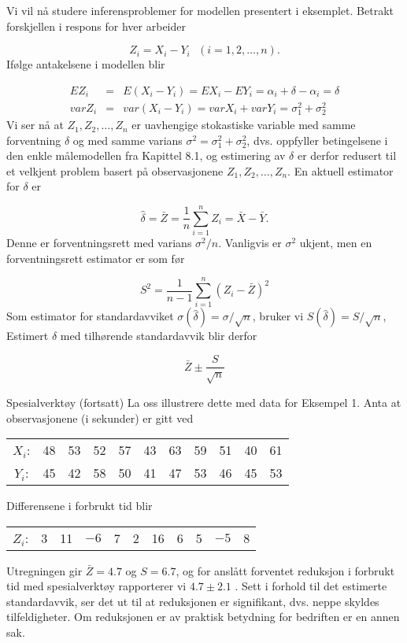Vi vil nå studere inferensproblemer for modellen presentert i 
eksemplet.  Betrakt forskjellen i respons for hver arbeider

\[  Z_i = X_i - Y_i  \mbox{\ \ \ }   (i = 1, 2, \ldots, n).      \]
Ifølge antakelsene i modellen blir

\begin{eqnarray*}
EZ_i&=& E(X_i-Y_i)=EX_i-EY_i={\alpha}_i + \delta - {\alpha}_i = \delta \\
varZ_i&=& var(X_i-Y_i)=varX_i+varY_i={\sigma}_1^2 + {\sigma}_2^2 
\end{eqnarray*}
Vi ser nå at $Z_1, Z_2, \ldots, Z_n$ er uavhengige stokastiske
variable med samme forventning $\delta$ og med samme varians
${\sigma}^2={\sigma}_1^2 + {\sigma}_2^2$, dvs.
oppfyller betingelsene i den enkle målemodellen fra Kapittel 8.1,
og estimering av $\delta$ er derfor redusert til et velkjent problem
basert på observasjonene $Z_1, Z_2, \ldots, Z_n$.  En aktuell
estimator for $\delta$ er 

\[ \hat{\delta}=\bar{Z}=\frac{1}{n} \sum_{i=1}^{n} Z_i=\bar{X}-\bar{Y}.  \]
Denne er forventningsrett med varians ${\sigma}^2/n$.
Vanligvis er ${\sigma}^2$ ukjent, men en forventningsrett estimator
er som før

\[  S^2=\frac{1}{n-1}  \sum_{i=1}^{n} {(Z_i-\bar{Z})}^2     \]
Som estimator for standardavviket $\sigma ({\hat{\delta}})=\sigma /\sqrt{n}$,
bruker vi $S({\hat{\delta}})=S/\sqrt{n}$,
Estimert $\delta$ med tilhørende standardavvik blir derfor

\[   \bar{Z} \pm \frac{S}{\sqrt{n}}        \]
\addtocounter{eksecount}{-1}
\begin{eksempel}{Spesialverktøy (fortsatt)}
La oss illustrere dette med data for Eksempel 1.  Anta at 
observasjonene (i sekunder) er gitt ved 
\begin{center}
\begin{tabular}{ccccccccccc}
$X_i$: &  48  &  53  &  52  &  57  &  43  &  63  &  59  &  51  &  40  &  61 \\
$Y_i$: &  45  &  42  &  58  &  50  &  41  &  47  &  53  &  46  &  45  &  53 
\end{tabular}
\end{center}
Differensene i forbrukt tid blir
\begin{center}
\begin{tabular}{ccccccccccc}
$Z_i$: & 3  &  11  & $-6$  &  7  &  2  &  16  &  6  &  5 & $-5$ & 8 
\end{tabular}
\end{center}
Utregningen gir $\bar{Z}=4.7$ og $S=6.7$, og for anslått forventet
reduksjon i forbrukt tid med spesialverktøy rapporterer vi $4.7 \pm 2.1$ .
Sett i forhold til det estimerte standardavvik, ser det ut til at reduksjonen
er signifikant, dvs. neppe skyldes tilfeldigheter.  Om reduksjonen er av
praktisk betydning for bedriften er en annen sak.
\end{eksempel}

